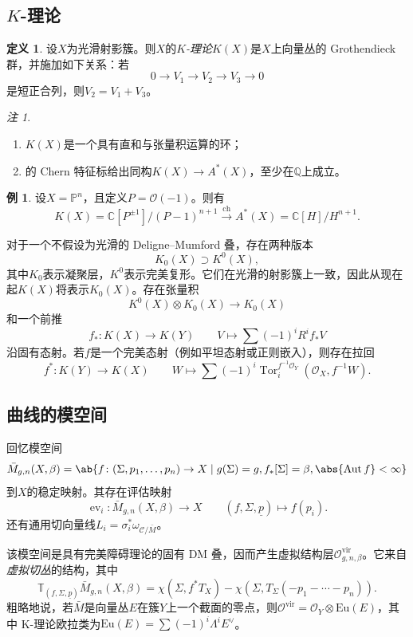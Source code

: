 \documentclass{amsart}
\theoremstyle{definition}
\newtheorem{defn}[thm]{定义}
\newtheorem{exm}[thm]{例}
\theoremstyle{remark}
\newtheorem{rmk}[thm]{注}
\theoremstyle{plain}
\theoremstyle{definition}
\theoremstyle{remark}
\newcommand{\C}{\mathbb{C}}
\newcommand{\Q}{\mathbb{Q}}
\renewcommand{\P}{\mathbb{P}}
\newcommand{\mc}[1]{\mathcal{#1}}
\newcommand{\mr}[1]{\mathrm{#1}}
\newcommand{\on}[1]{\operatorname{#1}}
\newcommand{\ul}[1]{\underline{#1}}
\newcommand{\1}{\mathbf{1}}
\newcommand{\2}{\mathbf{2}}
\newcommand{\3}{\mathbf{3}}
\newcommand{\vir}{\mr{vir}}
\DeclareMathOperator{\Aut}{Aut}
\DeclareMathOperator{\ev}{ev}
\begin{document}
\subsection{\(K\)-理论}%
\label{sub:K-theory}

\begin{defn}
    设\(X\)为光滑射影簇。则\(X\)的\textit{\(K\)-理论}\(K(X)\)是\(X\)上向量丛的 Grothendieck 群，并施加如下关系：若
    \[ 0 \to V_1 \to V_2 \to V_3 \to 0 \]
是短正合列，则\(V_2 = V_1 + V_3\)。
\end{defn}

\begin{rmk}\leavevmode
    \begin{enumerate}
\item \(K(X)\)是一个具有直和与张量积运算的环；
\item 的 Chern 特征标给出同构\(K(X) \to A^*(X)\)，至少在\(\Q\)上成立。
    \end{enumerate}
\end{rmk}

\begin{exm}
设\(X = \P^n\)，且定义\(P = \mc{O}(-1)\)。则有
    \[ K(X) = \C[P^{\pm 1}]/(P-1)^{n+1} \xrightarrow{\on{ch}} A^*(X) = \C[H]/H^{n+1}. \]
\end{exm}

对于一个不假设为光滑的 Deligne--Mumford 叠，存在两种版本
\[ K_0(X) \supset K^0(X), \]
其中\(K_0\)表示凝聚层，\(K^0\)表示完美复形。它们在光滑的射影簇上一致，因此从现在起\(K(X)\)将表示\(K_0(X)\)。存在张量积
\[ K^0(X) \otimes K_0(X) \to K_0(X) \]
和一个前推
\[ f_* \colon K(X) \to K(Y) \qquad V \mapsto \sum (-1)^i R^i f_* V \]
沿固有态射。若\(f\)是一个完美态射（例如平坦态射或正则嵌入），则存在拉回
\[ f^* \colon K(Y) \to K(X) \qquad W \mapsto \sum (-1)^i \on{Tor}_i^{f^{-1} \mc{O}_Y} (\mc{O}_X, f^{-1} W). \]

\subsection{曲线的模空间}%
\label{sub:Moduli of curves}

回忆模空间
\[ \bar{M}_{g,n}(X, \beta) = \ab\{ f \colon (\Sigma, p_1, \ldots, p_n) \to X \mid g(\Sigma) = g, f_*[\Sigma] = \beta, \abs{\Aut f} < \infty \} \]
到\(X\)的稳定映射。其存在评估映射
\[ \ev_i \colon \bar{M}_{g,n}(X, \beta) \to X \qquad (f, \Sigma, \ul{p}) \mapsto f(p_i). \]
还有通用切向量线\(L_i = \sigma_i^* \omega_{ \mc{C}/\bar{M} }\)。

该模空间是具有完美障碍理论的固有 DM 叠，因而产生虚拟结构层\(\mc{O}^{\vir}_{g,n,\beta}\)。它来自\textit{虚拟切丛}的结构，其中
\[ \mathbb{T}_{(f, \Sigma, \ul{p})} \bar{M}_{g,n}(X, \beta) = \chi(\Sigma, f^* T_X) - \chi(\Sigma, T_{\Sigma}(-p_1 - \cdots - p_n)). \]
粗略地说，若\(\bar{M}\)是向量丛\(E\)在簇\(Y\)上一个截面的零点，则\(\mc{O}^{\vir} = \mc{O}_Y \otimes \mr{Eu}(E)\)，其中 K-理论欧拉类为\(\mr{Eu}(E) = \sum (-1)^i \Lambda^i E^{\vee}\)。
\end{document}
